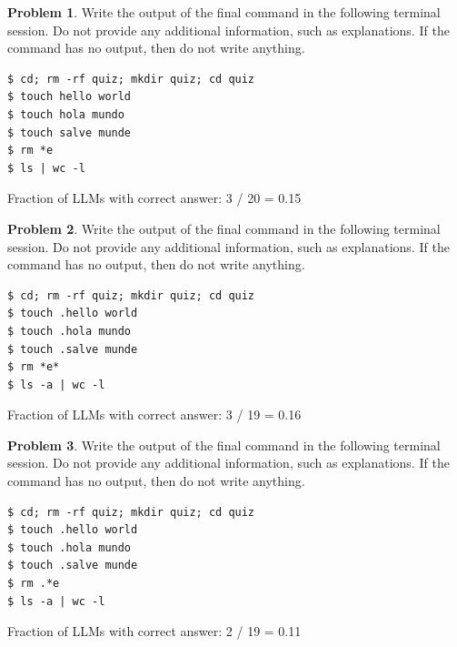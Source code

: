 \documentclass[10pt]{article}
\theoremstyle{definition}
\newtheorem{problem}{Problem}
\begin{document}
\noindent\vspace{0.1in}\begin{minipage}{\textwidth}

\begin{problem}
Write the output of the final command in the following terminal session.
Do not provide any additional information,
such as explanations.
If the command has no output,
then do not write anything.

\end{problem}
\begin{lstlisting}
$ cd; rm -rf quiz; mkdir quiz; cd quiz
$ touch hello world
$ touch hola mundo 
$ touch salve munde
$ rm *e
$ ls | wc -l
\end{lstlisting}

Fraction of LLMs with correct answer: 3 / 20 = 0.15
\end{minipage}
\noindent\vspace{0.1in}\begin{minipage}{\textwidth}

\begin{problem}
Write the output of the final command in the following terminal session.
Do not provide any additional information,
such as explanations.
If the command has no output,
then do not write anything.

\end{problem}
\begin{lstlisting}
$ cd; rm -rf quiz; mkdir quiz; cd quiz
$ touch .hello world
$ touch .hola mundo 
$ touch .salve munde
$ rm *e*
$ ls -a | wc -l
\end{lstlisting}

Fraction of LLMs with correct answer: 3 / 19 = 0.16
\end{minipage}
\noindent\vspace{0.1in}\begin{minipage}{\textwidth}

\begin{problem}
Write the output of the final command in the following terminal session.
Do not provide any additional information,
such as explanations.
If the command has no output,
then do not write anything.

\end{problem}
\begin{lstlisting}
$ cd; rm -rf quiz; mkdir quiz; cd quiz
$ touch .hello world
$ touch .hola mundo 
$ touch .salve munde
$ rm .*e
$ ls -a | wc -l
\end{lstlisting}

Fraction of LLMs with correct answer: 2 / 19 = 0.11
\end{minipage}
\end{document}
